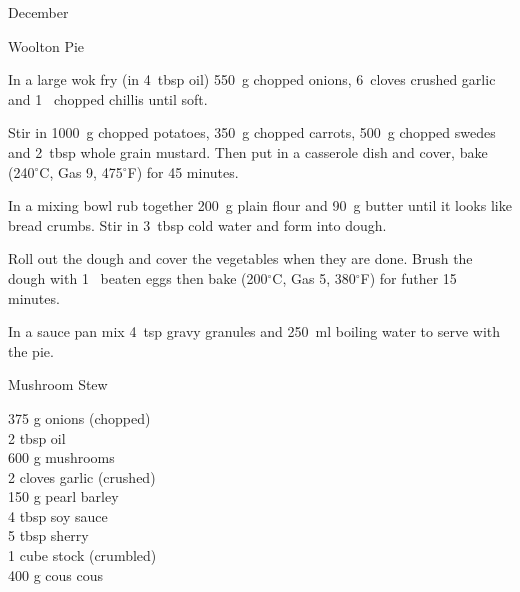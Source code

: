 \begin{menu}{December}
\begin{recipe}{2}{Woolton Pie}
    \begin{instructions}
    \item 
        In a large wok fry
        (in 4~tbsp  oil)
        550~g chopped onions,
        6~cloves crushed garlic
        and
        1~ chopped chillis
        until soft.
      \item 
        Stir in
        1000~g chopped potatoes,
        350~g chopped carrots,
        500~g chopped swedes
        and
        2~tbsp  whole grain mustard.
        Then put in a casserole dish and cover,
        bake (240$^{\circ}$C, Gas 9, 475$^{\circ}$F) for 45 minutes.
      \item 
        In a mixing bowl
        rub together
        200~g  plain flour
        and
        90~g  butter
        until it looks like bread crumbs.
        Stir in
        3~tbsp  cold water
        and form into dough.
      \item 
        Roll out the dough and cover the vegetables when they are done.
        Brush the dough with 1~ beaten eggs
        then bake (200$^{\circ}$C, Gas 5, 380$^{\circ}$F) for futher 15 minutes.
      \item 
        In a sauce pan mix
        4~tsp  gravy granules
        and
        250~ml  boiling water
        to serve with the pie.
      
    \end{instructions}
    \end{recipe}%
  
    \begin{recipe}{2}{Mushroom Stew}%
		\begin{ingredients}
		375 g onions (chopped) \\
	2 tbsp oil  \\
	600 g mushrooms  \\
	2 cloves garlic (crushed) \\
	150 g pearl barley  \\
	4 tbsp soy sauce  \\
	5 tbsp sherry  \\
	1 cube stock (crumbled) \\
	400 g cous cous  \\
	
		\end{ingredients}
	
	

\end{recipe}
\end{menu}
